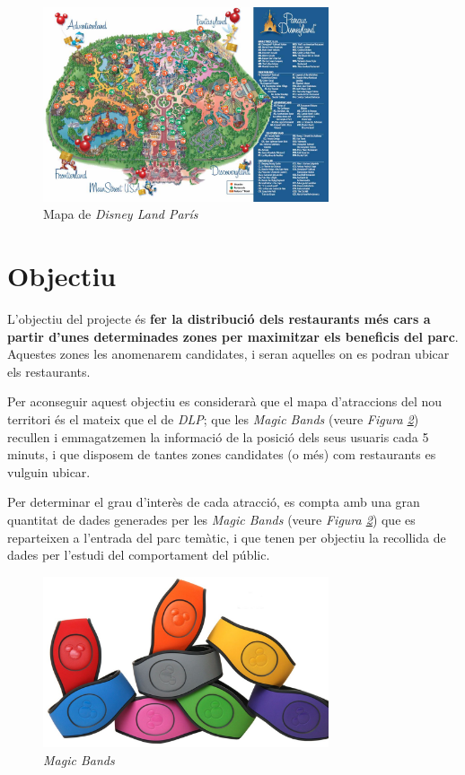 \documentclass[12pt]{article}
\begin{document}
\begin{figure}[H]
    \centering
    \includegraphics[width=0.75\textwidth]{imatges/mapa_disney_land_paris.jpg}\par\vspace{1cm}
    \caption{Mapa de \textit{Disney Land París}}
    \label{fig:disney1}
\end{figure}

\clearpage
\section{Objectiu}
L'objectiu del projecte és \textbf{fer la distribució dels restaurants més cars a partir d'unes determinades zones  per maximitzar els beneficis del parc}. Aquestes zones les anomenarem candidates, i seran aquelles on es podran ubicar els restaurants.

Per aconseguir aquest objectiu es considerarà que el mapa d'atraccions del nou territori és el mateix que el de \textit{DLP}; que les \textit{Magic Bands} (veure \textit{Figura \ref{fig:magic_bands}}) recullen i emmagatzemen la informació de la posició dels seus usuaris cada 5 minuts, i que disposem de tantes zones candidates (o més) com restaurants es vulguin ubicar. 

Per determinar el grau d'interès de cada atracció, es compta amb una gran quantitat de dades generades per les \textit{Magic Bands} (veure \textit{Figura \ref{fig:magic_bands}}) que es reparteixen a l'entrada del parc temàtic, i que tenen per objectiu la recollida de dades per l'estudi del comportament del públic. 

\begin{figure}[H]
    \centering
    \includegraphics[width=0.75\textwidth]{imatges/magic_bands.jpg}\par\vspace{1cm}
    \caption{\textit{Magic Bands}}
    \label{fig:magic_bands}
\end{figure}
\end{document}
